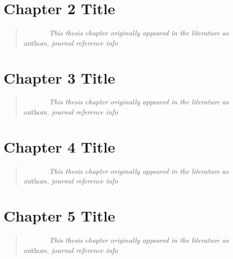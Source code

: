 \documentclass[plain]{hvdthesis}
\begin{document}
\chapter{Chapter 2 Title}\label{c:chap2}
\begin{quote}
{\em ~~~~~~~This thesis chapter originally appeared in the literature as} \\
{authors,
{\em journal reference info}}
\end{quote}

\clearpage
%
\chapter{Chapter 3 Title}\label{c:chap3}
\begin{quote}
{\em ~~~~~~~This thesis chapter originally appeared in the literature as} \\
{authors,
{\em journal reference info}}
\end{quote}

\clearpage
%
\chapter{Chapter 4 Title}\label{c:chap4}
\begin{quote}
{\em ~~~~~~~This thesis chapter originally appeared in the literature as} \\
{authors,
{\em journal reference info}}
\end{quote}

\clearpage
%
\chapter{Chapter 5 Title}\label{c:chap5}
\begin{quote}
{\em ~~~~~~~This thesis chapter originally appeared in the literature as} \\
{authors,
{\em journal reference info}}
\end{quote}



\singlespace


\end{document}
